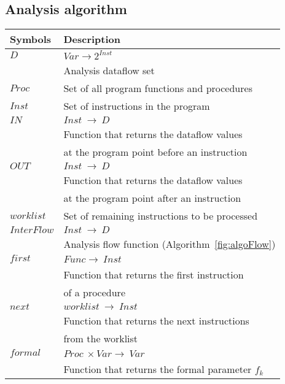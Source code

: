 \subsection{Analysis algorithm} 
\begin{table}
\begin{tabular}{|l|l|}
\hline
\textbf{Symbols}				&	\textbf{Description}								\\ \hline
$\mathit{D}$					&	$\mathit{Var} \rightarrow 2^\mathit{Inst}$			\\
								&	Analysis dataflow set 								\\ \hline
$\mathit{Proc}$					&	Set of all program functions and procedures 		\\ \hline
$\mathit{Inst}$					&	Set of instructions in the program 					\\ \hline
$\mathit{IN}$				&	$\mathit{Inst}\ \rightarrow\ \mathit{D}$ 			\\
								&	Function that returns the dataflow values			\\
		    					&	at the program point before an instruction 			\\ 	\hline
$\mathit{OUT}$				&	$\mathit{Inst}\ \rightarrow\ \mathit{D}$ 			\\
								&	Function that returns the dataflow values			\\
		    					&	at the program point after an instruction 			\\ 	\hline	    		
$\mathit{worklist}$				&	Set of remaining instructions to be processed 		\\ \hline
$\mathit{InterFlow}$					&	$\mathit{Inst}\ \rightarrow\ \mathit{D}$ 			\\
								&   Analysis flow function (Algorithm~\ref{fig:algoFlow}) 			\\ \hline
$\mathit{first}$				&	$\mathit{Func} \rightarrow\ \mathit{Inst}$ 			\\
								& 	Function that returns the first instruction			\\
								&	of a procedure										\\ \hline
$\mathit{next}$					&	$\mathit{worklist}\ \rightarrow\ \mathit{Inst}$ 	\\
								& 	Function that returns the next instructions			\\
								&	from the worklist									\\ \hline
$\mathit{formal}$				&	$\mathit{Proc}\ \times \mathit{Var} \rightarrow\ \mathit{Var}$ 	\\
								& 	Function that returns the formal parameter $f_k$	\\

\end{tabular}
\end{table}

